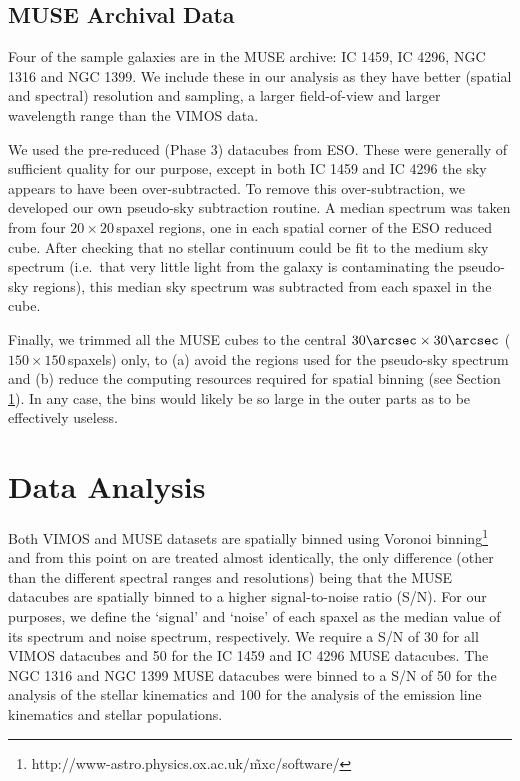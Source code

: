 \documentclass[a4paper,fleqn,usenatbib]{mnras}
\begin{document}
	\subsection{MUSE Archival Data}
		\label{subsec:MUSE}
		Four of the sample galaxies are in the MUSE archive: IC 1459, IC 4296, NGC 1316 and NGC 1399. We include these in our analysis as they have better (spatial and spectral) resolution and sampling, a larger field-of-view and larger wavelength range than the VIMOS data. 

		We used the pre-reduced (Phase 3) datacubes from ESO. These were generally of sufficient quality for our purpose, except in both IC 1459 and IC 4296 the sky appears to have been over-subtracted. To remove this over-subtraction, we developed our own pseudo-sky subtraction routine. A median spectrum was taken from four $20 \times 20$\,spaxel regions, one in each spatial corner of the ESO reduced cube. After checking that no stellar continuum could be fit to the medium sky spectrum (i.e.\ that very little light from the galaxy is contaminating the pseudo-sky regions), this median sky spectrum was subtracted from each spaxel in the cube. 

		Finally, we trimmed all the MUSE cubes to the central $30\arcsec \times 30\arcsec$ ($150 \times 150$\,spaxels) only, to (a) avoid the regions used for the pseudo-sky spectrum and (b) reduce the computing resources required for spatial binning (see Section \ref{sec:analysis}). In any case, the bins would likely be so large in the outer parts as to be effectively useless.

\section{Data Analysis}
	\label{sec:analysis}
	Both VIMOS and MUSE datasets are spatially binned using Voronoi binning\footnote{\label{fn:Cappellari}http://www-astro.physics.ox.ac.uk/\~mxc/software/} \citep{Cappellari2003} and from this point on are treated almost identically, the only difference (other than the different spectral ranges and resolutions) being that the MUSE datacubes are spatially binned to a higher signal-to-noise ratio (S/N). For our purposes, we define the `signal' and `noise' of each spaxel as the median value of its spectrum and noise spectrum, respectively. We require a S/N of 30 for all VIMOS datacubes and 50 for the IC 1459 and IC 4296 MUSE datacubes. The NGC 1316 and NGC 1399 MUSE datacubes were binned to a S/N of 50 for the analysis of the stellar kinematics and 100 for the analysis of the emission line kinematics and stellar populations.
\end{document}
